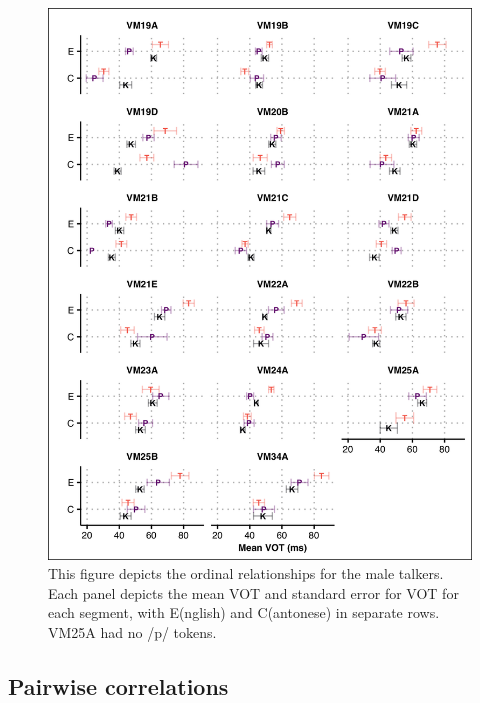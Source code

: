 \begin{figure}[htbp]
  \begin{center}
  \includegraphics[width=0.9\linewidth]{figures/ch4_ordrel_vm_5in.png} 
  \caption{This figure depicts the ordinal relationships for the male talkers. Each panel depicts the mean VOT and standard error for VOT for each segment, with E(nglish) and C(antonese) in separate rows. VM25A had no /p/ tokens. }
  \label{ch4:fig:ordrelvm}
  \end{center}
\end{figure}

\subsection{Pairwise correlations}\label{ch4:sec:correlations}

